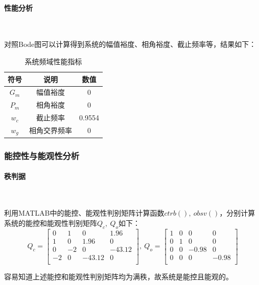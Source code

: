 \documentclass[UTF8]{article}
\begin{document}
\paragraph{性能分析}~{}

对照Bode图可以计算得到系统的幅值裕度、相角裕度、截止频率等，结果如下：
\begin{table}[H] %
\centering %
\begin{tabular}{ccc} %
	\toprule %
	符号 & 说明 & 数值 \\
	\midrule %
	$G_m$ & 幅值裕度 & 0 \\
	$P_m$ & 相角裕度 & 0 \\
	$w_c$ & 截止频率 & 0.9554 \\
	$w_g$ & 相角交界频率 & 0 \\
	\bottomrule %
\end{tabular}
\caption{系统频域性能指标} %
\end{table}

\subsubsection{能控性与能观性分析}

\paragraph{秩判据}~{}

利用MATLAB中的能控、能观性判别矩阵计算函数$ctrb(),\ obsv()$，分别计算系统的能控和能观性判别矩阵$Q_c,\ Q_o$如下：
\begin{equation*}
	Q_c = \begin{bmatrix}
		0 & 1 & 0 & 1.96 \\
		1 & 0 & 1.96 & 0 \\
		0 & -2 & 0 & -43.12 \\
		-2 & 0 & -43.12 & 0 \\
	\end{bmatrix},\ 
	Q_o = \begin{bmatrix}
		1 & 0 & 0 & 0 \\
		0 & 1 & 0 & 0 \\
		0 & 0 & -0.98 & 0 \\
		0 & 0 & 0 & -0.98 \\
	\end{bmatrix}
\end{equation*}

容易知道上述能控和能观性判别矩阵均为满秩，故系统是能控且能观的。
\end{document}

